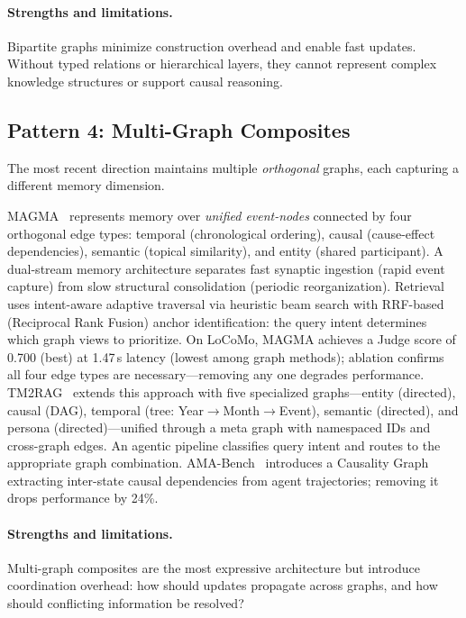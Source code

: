 \documentclass[hf]{ceurart}
\begin{document}
\paragraph{Strengths and limitations.}
Bipartite graphs minimize construction overhead and enable fast updates.
Without typed relations or hierarchical layers, they cannot represent
complex knowledge structures or support causal reasoning.

\subsection{Pattern 4: Multi-Graph Composites}

The most recent direction maintains multiple \emph{orthogonal}
graphs, each capturing a different memory dimension.

MAGMA~\cite{magma2026} represents memory over \emph{unified event-nodes}
connected by four orthogonal edge types: temporal (chronological
ordering), causal (cause-effect dependencies), semantic (topical
similarity), and entity (shared participant). A dual-stream memory
architecture separates fast synaptic ingestion (rapid event capture)
from slow structural consolidation (periodic reorganization).
Retrieval uses intent-aware adaptive traversal via heuristic beam
search with RRF-based (Reciprocal Rank Fusion) anchor identification:
the query intent determines which graph views to prioritize.
On LoCoMo, MAGMA achieves a Judge score of 0.700 (best) at 1.47\,s
latency (lowest among graph methods); ablation confirms all four
edge types are necessary---removing any one degrades performance.
TM2RAG~\cite{tm2rag2026} extends this approach with five specialized
graphs---entity (directed), causal (DAG), temporal (tree:
Year$\to$Month$\to$Event), semantic (directed), and
persona (directed)---unified through a meta graph with namespaced IDs
and cross-graph edges. An agentic pipeline classifies query intent
and routes to the appropriate graph combination.
AMA-Bench~\cite{amabench2026} introduces a Causality Graph extracting
inter-state causal dependencies from agent trajectories; removing it
drops performance by 24\%.

\paragraph{Strengths and limitations.}
Multi-graph composites are the most expressive architecture but
introduce coordination overhead: how should updates propagate across
graphs, and how should conflicting information be resolved?
\end{document}

